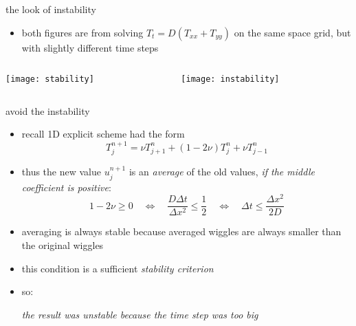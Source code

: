 \begin{frame}{the look of instability}

\begin{itemize}
\item both figures are from solving $T_t = D(T_{xx} + T_{yy})$ on the same space grid, but with slightly different time steps
\end{itemize}

\bigskip\bigskip
\begin{columns}
\begin{column}{0.5\textwidth}
\begin{center}
\texttt{[image: stability]}

\end{center}
\end{column}
\begin{column}{0.5\textwidth}
\begin{center}
\texttt{[image: instability]}

\end{center}
\end{column}
\end{columns}
\end{frame}


\begin{frame}{avoid the instability}
\label{slide:maxprinc}

\begin{itemize}
\item recall 1D explicit scheme had the form 
	$$T_j^{n+1} = \nu T_{j+1}^n + (1 - 2 \nu) T_j^n + \nu T_{j-1}^n$$
\item thus the new value $u_j^{n+1}$ is an \emph{average} of the old values, \emph{if the middle coefficient is positive}:
	$$1 - 2 \nu \ge 0 \quad \iff \quad  \frac{D\Delta t}{\Delta x^2} \le \frac{1}{2} \quad \iff \quad \Delta t \le \frac{\Delta x^2}{2 D}$$
\item averaging is always stable because averaged wiggles are always smaller than the original wiggles
\item this condition is a sufficient \emph{stability criterion}
\item so:

\begin{center}
\emph{the result was unstable because the time step was too big}
\end{center}
\end{itemize}
\end{frame}


